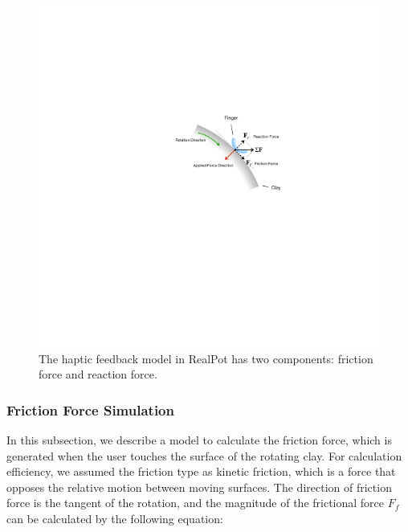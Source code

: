 \documentclass{svjour3}                     %
\begin{document}
\begin{figure}
\includegraphics[width=\textwidth]{fig15}
\caption{{\color{blue}The haptic feedback model in RealPot has two components: friction force and reaction force.}}
\label{fig:haptic}
\end{figure}



\subsubsection{Friction Force Simulation}

In this subsection, we describe a model to calculate the friction force, which is generated when the user touches the surface of the rotating clay.
For calculation efficiency, we assumed the friction type as kinetic friction, which is a force that opposes the relative motion between moving surfaces.
The direction of friction force is the tangent of the rotation, and the magnitude of the frictional force $F_{f}$ can be calculated by the following equation:
\end{document}
